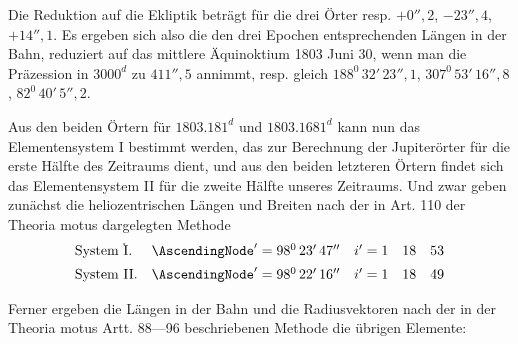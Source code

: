 \par
Die Reduktion auf die Ekliptik beträgt für die drei Örter resp. \(+0'',\!2\), \(-23'',\!4\), \(+14'',\!1\). Es ergeben sich also die den drei Epochen entsprechenden Längen in der Bahn, reduziert auf das mittlere Äquinoktium 1803 Juni 30, wenn man die Präzession in \(3000^{d}\) zu \(411'',\!5\) annimmt, resp. gleich \(188^{0}\,32'\,23'',\!1\), \(307^{0}\,53'\,16'',\!8\), \(82^{0}\,40'\,5'',\!2\).
\par
Aus den beiden Örtern für \(1803.181^{d}\) und \(1803.1681^{d}\) kann nun das Elementensystem I bestimmt werden, das zur Berechnung der Jupiterörter für die erste Hälfte des Zeitraums dient, und aus den beiden letzteren Örtern findet sich das Elementensystem II für die zweite Hälfte unseres Zeitraums. Und zwar geben zunächst die heliozentrischen Längen und Breiten nach der in Art. 110 der Theoria motus dargelegten Methode
\[
\begin{array}{lll}
\text{System \rlap{\kern-.08em\raisebox{1.7ex}{.}}I.}&\AscendingNode'=98^{0}\,23'\,47''&i'=1\quad18\quad53\\[5pt]
\text{System II.}&\AscendingNode'=98^{0}\,22'\,16''&i'=1\quad18\quad49
\end{array}
\]
\par
Ferner ergeben die Längen in der Bahn und die Radiusvektoren nach der in der Theoria motus Artt. 88—96 beschriebenen Methode die übrigen Elemente:

